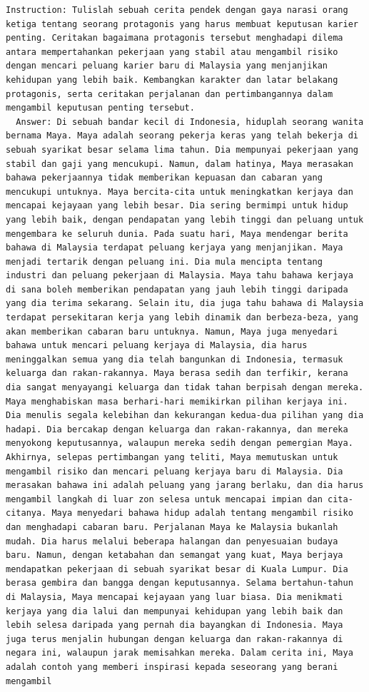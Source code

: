 \documentclass{article}
\begin{document}
\begin{lstlisting}[breaklines=true]
  Instruction: Tulislah sebuah cerita pendek dengan gaya narasi orang ketiga tentang seorang protagonis yang harus membuat keputusan karier penting. Ceritakan bagaimana protagonis tersebut menghadapi dilema antara mempertahankan pekerjaan yang stabil atau mengambil risiko dengan mencari peluang karier baru di Malaysia yang menjanjikan kehidupan yang lebih baik. Kembangkan karakter dan latar belakang protagonis, serta ceritakan perjalanan dan pertimbangannya dalam mengambil keputusan penting tersebut.
  Answer: Di sebuah bandar kecil di Indonesia, hiduplah seorang wanita bernama Maya. Maya adalah seorang pekerja keras yang telah bekerja di sebuah syarikat besar selama lima tahun. Dia mempunyai pekerjaan yang stabil dan gaji yang mencukupi. Namun, dalam hatinya, Maya merasakan bahawa pekerjaannya tidak memberikan kepuasan dan cabaran yang mencukupi untuknya. Maya bercita-cita untuk meningkatkan kerjaya dan mencapai kejayaan yang lebih besar. Dia sering bermimpi untuk hidup yang lebih baik, dengan pendapatan yang lebih tinggi dan peluang untuk mengembara ke seluruh dunia. Pada suatu hari, Maya mendengar berita bahawa di Malaysia terdapat peluang kerjaya yang menjanjikan. Maya menjadi tertarik dengan peluang ini. Dia mula mencipta tentang industri dan peluang pekerjaan di Malaysia. Maya tahu bahawa kerjaya di sana boleh memberikan pendapatan yang jauh lebih tinggi daripada yang dia terima sekarang. Selain itu, dia juga tahu bahawa di Malaysia terdapat persekitaran kerja yang lebih dinamik dan berbeza-beza, yang akan memberikan cabaran baru untuknya. Namun, Maya juga menyedari bahawa untuk mencari peluang kerjaya di Malaysia, dia harus meninggalkan semua yang dia telah bangunkan di Indonesia, termasuk keluarga dan rakan-rakannya. Maya berasa sedih dan terfikir, kerana dia sangat menyayangi keluarga dan tidak tahan berpisah dengan mereka. Maya menghabiskan masa berhari-hari memikirkan pilihan kerjaya ini. Dia menulis segala kelebihan dan kekurangan kedua-dua pilihan yang dia hadapi. Dia bercakap dengan keluarga dan rakan-rakannya, dan mereka menyokong keputusannya, walaupun mereka sedih dengan pemergian Maya. Akhirnya, selepas pertimbangan yang teliti, Maya memutuskan untuk mengambil risiko dan mencari peluang kerjaya baru di Malaysia. Dia merasakan bahawa ini adalah peluang yang jarang berlaku, dan dia harus mengambil langkah di luar zon selesa untuk mencapai impian dan cita-citanya. Maya menyedari bahawa hidup adalah tentang mengambil risiko dan menghadapi cabaran baru. Perjalanan Maya ke Malaysia bukanlah mudah. Dia harus melalui beberapa halangan dan penyesuaian budaya baru. Namun, dengan ketabahan dan semangat yang kuat, Maya berjaya mendapatkan pekerjaan di sebuah syarikat besar di Kuala Lumpur. Dia berasa gembira dan bangga dengan keputusannya. Selama bertahun-tahun di Malaysia, Maya mencapai kejayaan yang luar biasa. Dia menikmati kerjaya yang dia lalui dan mempunyai kehidupan yang lebih baik dan lebih selesa daripada yang pernah dia bayangkan di Indonesia. Maya juga terus menjalin hubungan dengan keluarga dan rakan-rakannya di negara ini, walaupun jarak memisahkan mereka. Dalam cerita ini, Maya adalah contoh yang memberi inspirasi kepada seseorang yang berani mengambil 
\end{lstlisting}
\end{document}
